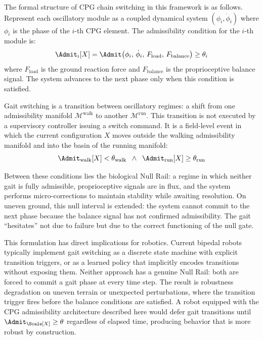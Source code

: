 \documentclass[11pt,oneside]{book}
\begin{document}
The formal structure of CPG chain switching in this framework is as follows. Represent each oscillatory module as a coupled dynamical system $(\phi_i, \dot{\phi}_i)$ where $\phi_i$ is the phase of the $i$-th CPG element. The admissibility condition for the $i$-th module is:
\begin{equation}
    \Admit_i[X] = \Admit\bigl(\phi_i,\, \dot{\phi}_i,\, F_{\mathrm{load}},\, F_{\mathrm{balance}}\bigr) \ge \theta_i
\end{equation}
where $F_{\mathrm{load}}$ is the ground reaction force and $F_{\mathrm{balance}}$ is the proprioceptive balance signal. The system advances to the next phase only when this condition is satisfied.

Gait switching is a transition between oscillatory regimes: a shift from one admissibility manifold $\mathcal{M}^{\mathrm{walk}}$ to another $\mathcal{M}^{\mathrm{run}}$. This transition is not executed by a supervisory controller issuing a switch command. It is a field-level event in which the current configuration $X$ moves outside the walking admissibility manifold and into the basin of the running manifold:
\begin{equation}
    \Admit_{\mathrm{walk}}[X] < \theta_{\mathrm{walk}} \;\;\wedge\;\; \Admit_{\mathrm{run}}[X] \ge \theta_{\mathrm{run}}
\end{equation}

Between these conditions lies the biological Null Rail: a regime in which neither gait is fully admissible, proprioceptive signals are in flux, and the system performs micro-corrections to maintain stability while awaiting resolution. On uneven ground, this null interval is extended: the system cannot commit to the next phase because the balance signal has not confirmed admissibility. The gait ``hesitates'' not due to failure but due to the correct functioning of the null gate.

This formulation has direct implications for robotics. Current bipedal robots typically implement gait switching as a discrete state machine with explicit transition triggers, or as a learned policy that implicitly encodes transitions without exposing them. Neither approach has a genuine Null Rail: both are forced to commit a gait phase at every time step. The result is robustness degradation on uneven terrain or unexpected perturbations, where the transition trigger fires before the balance conditions are satisfied. A robot equipped with the CPG admissibility architecture described here would defer gait transitions until $\Admit_\Scale[X] \ge \theta$ regardless of elapsed time, producing behavior that is more robust by construction.
\end{document}

